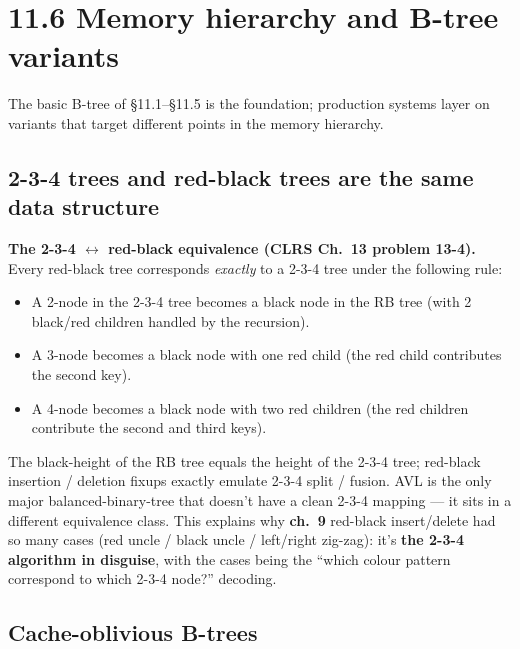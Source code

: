 \documentclass[11pt]{article}
\begin{document}
\section{11.6 Memory hierarchy and B-tree variants}

The basic B-tree of \S11.1--\S11.5 is the foundation; production
systems layer on variants that target different points in the
memory hierarchy.

\subsection*{2-3-4 trees and red-black trees are the same data structure}

\begin{notebox}
\textbf{The 2-3-4 $\leftrightarrow$ red-black equivalence
(CLRS Ch.~13 problem 13-4).} Every red-black tree corresponds
\emph{exactly} to a 2-3-4 tree under the following rule:
\begin{itemize}[leftmargin=*]
    \item A 2-node in the 2-3-4 tree becomes a black node in the RB
          tree (with 2 black/red children handled by the recursion).
    \item A 3-node becomes a black node with one red child (the red
          child contributes the second key).
    \item A 4-node becomes a black node with two red children
          (the red children contribute the second and third keys).
\end{itemize}
The black-height of the RB tree equals the height of the 2-3-4 tree;
red-black insertion / deletion fixups exactly emulate 2-3-4 split /
fusion. AVL is the only major balanced-binary-tree that doesn't have
a clean 2-3-4 mapping --- it sits in a different equivalence class.
This explains why \textbf{ch.~9} red-black insert/delete had so many
cases (red uncle / black uncle / left/right zig-zag): it's
\textbf{the 2-3-4 algorithm in disguise}, with the cases being the
``which colour pattern correspond to which 2-3-4 node?'' decoding.
\end{notebox}

\subsection*{Cache-oblivious B-trees}
\end{document}
